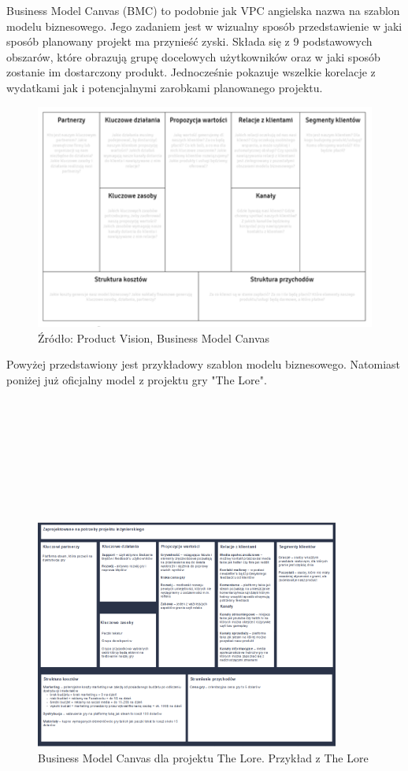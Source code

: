 \documentclass[oneside,polski,logo]{amuthesis}
\begin{document}
Business Model Canvas (BMC) to podobnie jak VPC angielska nazwa na szablon modelu biznesowego. Jego zadaniem jest w wizualny sposób przedstawienie w jaki sposób planowany projekt ma przynieść zyski. Składa się z 9 podstawowych obszarów, które obrazują grupę docelowych użytkowników oraz w jaki sposób zostanie im dostarczony produkt. Jednocześnie pokazuje wszelkie korelacje z wydatkami jak i potencjalnymi zarobkami planowanego projektu.\cite{BMC}\\


\begin{figure}[h]
	\centering
	\includegraphics[width=15cm]{images/hyps/BMC.png}
	\caption{Źródło: Product Vision, Business Model Canvas}
\end{figure}

Powyżej przedstawiony jest przykładowy szablon modelu biznesowego. Natomiast poniżej już oficjalny model z projektu gry "The Lore".\\ \\ \\ \\ \\ \\ \\ \\ \\

\begin{figure}[h]
	\centering
	\includegraphics[width=10cm]{images/hyps/BMC - The Lore.png}
	\caption{Business Model Canvas dla projektu The Lore. Przykład z The Lore}
\end{figure}
\end{document}
